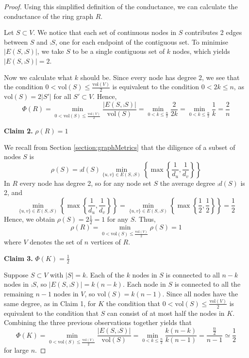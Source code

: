 \begin{proof}
Using this simplified definition of the conductance, we can calculate the conductance of the ring graph $R$. 

Let $S \subset V$.  We notice that each set of continuous nodes in $S$ contributes 2 edges between $S$ and $\comp{S}$, one for each endpoint of the contiguous set.
To minimise $|E(S, \comp{S})|$, we take $S$ to be a single contiguous set of $k$ nodes, which yields $|E(S, \comp{S})| = 2$. 

Now we calculate what $k$ should be. Since every node has degree 2, we see that the condition $0 < \text{vol}(S) \leq \frac{\text{vol}(V)}{2}$ is equivalent to the condition $0 < 2k \leq n$, as $\text{vol}(S) = 2|S'|$ for all $S' \subset V$. Hence,
$$
	\Phi(R) 
	=\min_{0 < \text{vol}(S) \leq \frac{\text{vol}(V)}{2}} \frac{|E(S, \comp{S})|}{\text{vol}(S)} 
	= \min_{0 < k \leq \frac{n}{2}} \frac{2}{2k} 
	= \min_{0 < k \leq \frac{n}{2}} \frac{1}{k} 
	= \frac{2}{n}
$$

\textbf{Claim 2.} $\rho(R)=1$

We recall from Section \ref{section:graphMetrics} that the diligence of a subset of nodes $S$ is
$$
\rho(S) = \comp{d}(S) \min_{\{u, v\} \in E(S, \comp{S}) } \left\{ \max \left\{ \frac{1}{d_u},\frac{1}{d_v} \right\} \right\}
$$ 
In $R$ every node has degree 2, so for any node set $S$ the average degree $\comp{d}(S)$ is 2, and 
$$
	\min_{\{u, v\} \in E(S, \comp{S}) } \left\{ \max \left\{ \frac{1}{d_u},\frac{1}{d_v} \right\} \right\}
	= 
	\min_{\{u, v\} \in E(S, \comp{S}) } \left\{ \max \left\{ \frac{1}{2},\frac{1}{2} \right\} \right\}
	=
	\frac{1}{2}
$$
Hence, we obtain $\rho(S) = 2 \frac{1}{2} = 1$ for any $S$. Thus, 
$$
	\rho(R) =  \min_{0 < \text{vol}(S) \leq \frac{\text{vol}(V)}{2}} \rho(S) = 1 
$$
where $V$ denotes the set of $n$ vertices of $R$.

\textbf{Claim 3.}  $\Phi(K)=\frac{1}{2}$

Suppose $S \subset V$ with $|S| = k$. Each of the $k$ nodes in $S$ is connected to all $n - k$ nodes in $\comp{S}$, so $|E(S, \comp{S})| = k(n - k)$. Each node in $S$ is connected to all the remaining $n - 1$ nodes in $V$, so $\text{vol}(S) = k(n-1)$. Since all nodes have the same degree, as in Claim 1, for $K$ the condition that $0 < \text{vol}(S) \leq \frac{\text{vol}(V)}{2}$ is equivalent to the condition that $S$ can consist of at most half the nodes in $K$. Combining the three previous observations together yields that
$$
	\Phi(K) = \min_{0 < \text{vol}(S) \leq \frac{\text{vol}(V)}{2}} \frac{|E(S, \comp{S})|}{\text{vol}(S)} 
	= \min_{0 < k \leq \frac{n}{2}} \frac{k(n-k)}{k(n-1)} 
	= \frac{\frac{n}{2}}{n-1}
	\simeq \frac{1}{2}
$$
for large $n$.


\end{proof}
